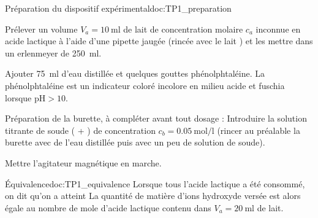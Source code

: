 \begin{doc}{Préparation du dispositif expérimental}{doc:TP1_preparation}
  \begin{listePoints}
    \item Prélever un volume $V_a = \qty{10}{\ml}$ de lait de concentration molaire $c_a$ inconnue en acide lactique à l’aide d’une pipette jaugée (rincée avec le lait ) et les mettre dans un erlenmeyer de \qty{250}{\ml}.
    \item Ajouter \qty{75}{\ml} d’eau distillée et quelques gouttes
    phénolphtaléine. La phénolphtaléine est un indicateur coloré incolore en milieu acide et fuschia lorsque $\text{pH} > 10$.
    \item Préparation de la burette, à compléter avant tout dosage :
    Introduire la solution titrante de soude ( + \hydroxyde) de concentration $c_b = \qty{0,05}{\mol\per\litre}$ (rincer au préalable la burette avec de l’eau distillée puis avec un peu de solution de soude).
    \item Mettre l’agitateur magnétique en marche.
  \end{listePoints}
\end{doc}


\begin{doc}{Équivalence}{doc:TP1_equivalence}
  Lorsque tous l'acide lactique a été consommé, on dit qu'on a atteint 
  La quantité de matière d’ions hydroxyde \hydroxyde versée est alors égale au nombre de mole
  d’acide lactique contenu dans $V_a = \qty{20}{\ml}$ de lait.
\end{doc}







